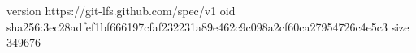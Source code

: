 version https://git-lfs.github.com/spec/v1
oid sha256:3ec28adfef1bf666197cfaf232231a89e462c9c098a2cf60ca27954726c4e5c3
size 349676
